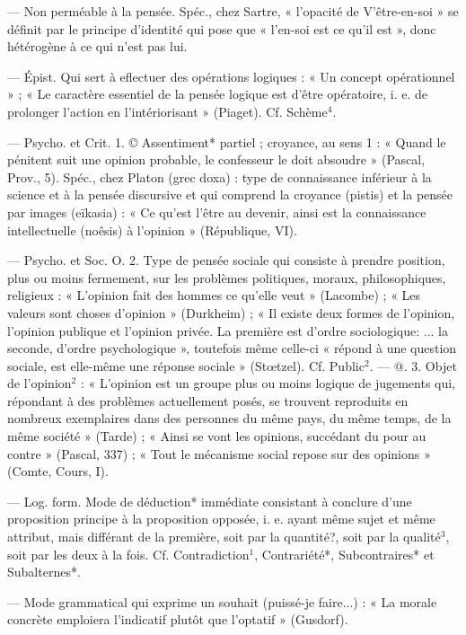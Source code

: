 \begin{itemize}[leftmargin=1cm, label=, itemsep=1pt]
 — Non perméable à la pensée.
Spéc., chez Sartre, « l’opacité de
V’être-en-soi » se définit par le principe d'identité qui pose que « l’en-soi
est ce qu’il est », donc hétérogène à
ce qui n’est pas lui.

 — Épist.
Qui sert à eflectuer des opérations
logiques : « Un concept opérationnel » ; « Le caractère essentiel de la
pensée logique est d’être opératoire,
i. e. de prolonger l'action en l’intériorisant » (Piaget). Cf. Schème$^4$.

 — Psycho. et Crit. 1. ©
Assentiment* partiel ; croyance, au
sens 1 : « Quand le pénitent suit une
opinion probable, le confesseur le
doit absoudre » (Pascal, Prov., 5).
Spéc., chez Platon (grec doxa) : type
de connaissance inférieur à la science
et à la pensée discursive et qui comprend la croyance (pistis) et la
pensée par images (eïkasia) : « Ce
qu'est l'être au devenir, ainsi est la
connaissance intellectuelle (noêsis) à
l'opinion » (République, VI).

— Psycho. et Soc. O. 2. Type de
pensée sociale qui consiste à prendre
position, plus ou moins fermement,
sur les problèmes politiques, moraux,
philosophiques, religieux : « L'opinion fait des hommes ce qu'elle
veut » (Lacombe) ; « Les valeurs
sont choses d'opinion » (Durkheim) ;
« Il existe deux formes de l'opinion,
l'opinion publique et l'opinion privée.
La première est d'ordre sociologique: ... la seconde, d'ordre psychologique », toutefois même celle-ci
« répond à une question sociale, est
elle-même une réponse sociale »
(Stœtzel). Cf. Public$^2$. — @. 3. Objet
de l'opinion$^2$ : « L'opinion est un
groupe plus ou moins logique de
jugements qui, répondant à des
problèmes actuellement posés, se
trouvent reproduits en nombreux
exemplaires dans des personnes du
même pays, du même temps, de la
même société » (Tarde) ; « Ainsi se
vont les opinions, succédant du pour
au contre » (Pascal, 337) ; « Tout le
mécanisme social repose sur des
opinions » (Comte, Cours, I).

 — Log. form. Mode de
déduction* immédiate consistant à
conclure d’une proposition principe
à la proposition opposée, i. e. ayant
même sujet et même attribut, mais
différant de la première, soit par la
quantité?, soit par la qualité$^3$, soit
par les deux à la fois. Cf. Contradiction$^1$, Contrariété*, Subcontraires*
et Subalternes*.

 — Mode grammatical qui
exprime un souhait  (puissé-je
faire...) : « La morale concrète emploiera l'indicatif plutôt que l’optatif » (Gusdorf).


\end{itemize}
